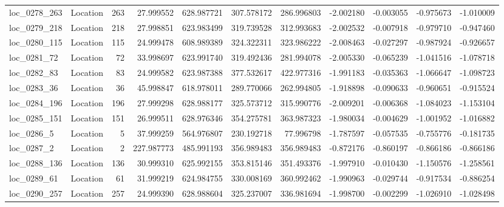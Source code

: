 \begin{tabular}{llrrrrrrrrr}
 loc_0278_263 &        Location &             263 &  27.999552 & 628.987721 &  307.578172 &    286.996803 &  -2.002180 &  -0.003055 &   -0.975673 &     -1.010009 \\
 loc_0279_218 &        Location &             218 &  27.998851 & 623.983499 &  319.739528 &    312.993683 &  -2.002532 &  -0.007918 &   -0.979710 &     -0.947460 \\
 loc_0280_115 &        Location &             115 &  24.999478 & 608.989389 &  324.322311 &    323.986222 &  -2.008463 &  -0.027297 &   -0.987924 &     -0.926657 \\
  loc_0281_72 &        Location &              72 &  33.998697 & 623.991740 &  319.492436 &    281.994078 &  -2.005330 &  -0.065239 &   -1.041516 &     -1.078718 \\
  loc_0282_83 &        Location &              83 &  24.999582 & 623.987388 &  377.532617 &    422.977316 &  -1.991183 &  -0.035363 &   -1.066647 &     -1.098723 \\
  loc_0283_36 &        Location &              36 &  45.998847 & 618.978011 &  289.770066 &    262.994805 &  -1.918898 &  -0.090633 &   -0.960651 &     -0.915524 \\
 loc_0284_196 &        Location &             196 &  27.999298 & 628.988177 &  325.573712 &    315.990776 &  -2.009201 &  -0.006368 &   -1.084023 &     -1.153104 \\
 loc_0285_151 &        Location &             151 &  26.999511 & 628.976346 &  354.275781 &    363.987323 &  -1.980034 &  -0.004629 &   -1.001952 &     -1.016882 \\
   loc_0286_5 &        Location &               5 &  37.999259 & 564.976807 &  230.192718 &     77.996798 &  -1.787597 &  -0.057535 &   -0.755776 &     -0.181735 \\
   loc_0287_2 &        Location &               2 & 227.987773 & 485.991193 &  356.989483 &    356.989483 &  -0.872176 &  -0.860197 &   -0.866186 &     -0.866186 \\
 loc_0288_136 &        Location &             136 &  30.999310 & 625.992155 &  353.815146 &    351.493376 &  -1.997910 &  -0.010430 &   -1.150576 &     -1.258561 \\
  loc_0289_61 &        Location &              61 &  31.999219 & 624.984755 &  330.008169 &    360.992462 &  -1.990963 &  -0.029744 &   -0.917534 &     -0.886254 \\
 loc_0290_257 &        Location &             257 &  24.999390 & 628.988604 &  325.237007 &    336.981694 &  -1.998700 &  -0.002299 &   -1.026910 &     -1.028498 \\

\end{tabular}
